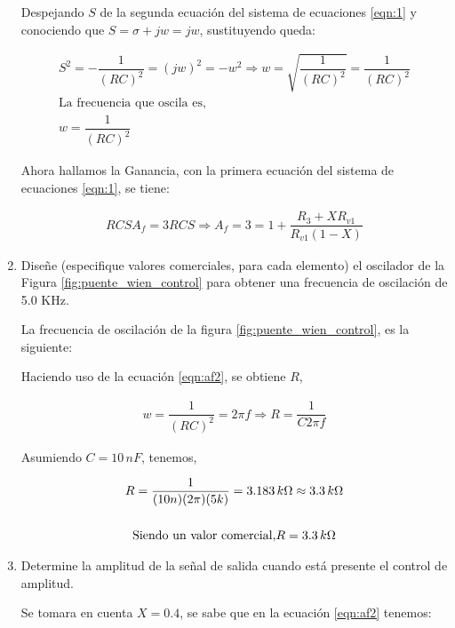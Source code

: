 \begin{enumerate}
            Despejando $S$ de la segunda ecuación del sistema de ecuaciones \ref{eqn:1} y conociendo que $S=\sigma + jw=jw $, sustituyendo queda:

            \begin{gather}
                S^2=-\dfrac{1}{(RC)^2}=(jw)^2=-w^2 \Longrightarrow w=\sqrt{\dfrac{1}{(RC)^2}}=\dfrac{1}{(RC)^2} \nonumber  \\[0.5cm]
                \text{La frecuencia que oscila es, }\nonumber  \\[0.5cm]
                w=\dfrac{1}{(RC)^2} \label{eqn:w}
            \end{gather}

            Ahora hallamos la Ganancia, con la primera ecuación del sistema de ecuaciones  \ref{eqn:1}, se tiene:

            \begin{gather}
                RCSA_f=3RCS \Rightarrow A_f=3=1+\dfrac{R_3+XR_{v1}}{R_{v1}(1-X)} \label{eqn:af2}
            \end{gather}

        \item Diseñe (especifique valores comerciales, para cada elemento) el oscilador de la Figura \ref{fig:puente_wien_control} para obtener una frecuencia de oscilación de 5.0 KHz.

            La frecuencia de oscilación de la figura \ref{fig:puente_wien_control}, es la siguiente:

            Haciendo uso de la ecuación \ref{eqn:af2}, se obtiene $R$,

            \begin{gather}
                w=\dfrac{1}{(RC)^2}=2\pi f \Longrightarrow R= \dfrac{1}{C2\pi f} \label{eqn:R}
            \end{gather}

            Asumiendo $C=10 \, nF$, tenemos,

            \begin{gather}
                R=\dfrac{1}{(10n)(2\pi)(5k)}=3.183 \, k\ohm \approx 3.3 \, k \ohm \nonumber  \\[0.5cm]
                \text{Siendo un valor comercial,} R=3.3 \, k \ohm
            \end{gather}

        \item Determine la amplitud de la señal de salida cuando está presente el control de amplitud.

            Se tomara en cuenta $X=0.4$, se sabe que en la ecuación \ref{eqn:af2} tenemos:


\end{enumerate}
